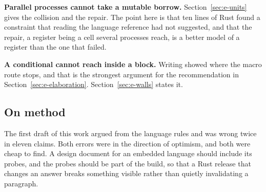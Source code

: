 \textbf{Parallel processes cannot take a mutable borrow.}
Section~\ref{sec:e-units} gives the collision and the repair. The point
here is that ten lines of Rust found a constraint that reading the language
reference had not suggested, and that the repair, a register being a cell
several processes reach, is a better model of a register than the one that
failed.

\textbf{A  conditional cannot reach inside a block.}
Writing  showed where the macro route stops, and that is the
strongest argument for the recommendation in
Section~\ref{sec:e-elaboration}. Section~\ref{sec:e-walls} states it.

\subsection{On method}

The first draft of this work argued from the language rules and was wrong
twice in eleven claims. Both errors were in the direction of optimism, and
both were cheap to find. A design document for an embedded language should
include its probes, and the probes should be part of the build, so that a
Rust release that changes an answer breaks something visible rather than
quietly invalidating a paragraph.
